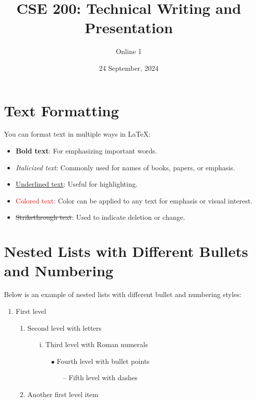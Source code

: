 \documentclass{article}
\title{CSE 200: Technical Writing and Presentation}
\author{Online 1}
\date{24 September, 2024}
\begin{document}
\maketitle

\section{Text Formatting}
You can format text in multiple ways in LaTeX:
\begin{itemize}
    \item \textbf{Bold text}: For emphasizing important words.
    \item \textit{Italicized text}: Commonly used for names of books, papers, or emphasis.
    \item \underline{Underlined text}: Useful for highlighting.
    \item \textcolor{red}{Colored text}: Color can be applied to any text for emphasis or visual interest.
    \item \st{Strikethrough text}: Used to indicate deletion or change.
\end{itemize}


\section{Nested Lists with Different Bullets and Numbering}
Below is an example of nested lists with different bullet and numbering styles:
\begin{enumerate}
    \item First level
    \begin{enumerate}
        \item Second level with letters
        \begin{enumerate}
            \item[i.] Third level with Roman numerals
            \begin{enumerate}
                 \item[$\bullet$] Fourth level with bullet points
                  \begin{enumerate}
                     \item[--] Fifth level with dashes
                 \end{enumerate}
            \end{enumerate}
        \end{enumerate}
        \item Another first level item
    \end{enumerate}
\end{enumerate}
\end{document}

